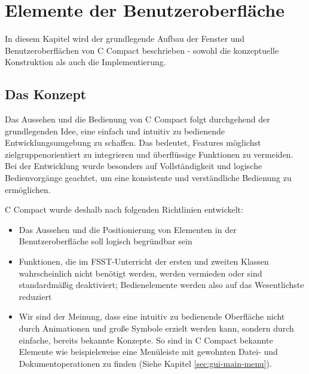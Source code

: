 

\chapter{Elemente der Benutzeroberfläche}
In diesem Kapitel wird der grundlegende Aufbau der Fenster und Benutzeroberflächen von C Compact beschrieben - sowohl die konzeptuelle Konstruktion als auch die Implementierung.
\section{Das Konzept}
Das Aussehen und die Bedienung von C Compact folgt durchgehend der grundlegenden Idee, eine einfach und intuitiv zu bedienende Entwicklungsumgebung zu schaffen. Das bedeutet, Features möglichst zielgruppenorientiert zu integrieren und überflüssige Funktionen zu vermeiden. Bei der Entwicklung wurde besonders auf Vollständigkeit und logische Bedienvorgänge geachtet, um eine konsistente und verständliche Bedienung zu ermöglichen.

C Compact wurde deshalb nach folgenden Richtlinien entwickelt:
\begin{itemize}
\item Das Aussehen und die Positionierung von Elementen in der Benutzeroberfläche soll logisch begründbar sein
\item Funktionen, die im FSST-Unterricht der ersten und zweiten Klassen wahrscheinlich nicht benötigt werden, werden vermieden oder sind standardmäßig deaktiviert; Bedienelemente werden also auf das Wesentlichste reduziert
\item Wir sind der Meinung, dass eine intuitiv zu bedienende Oberfläche nicht durch Animationen und große Symbole erzielt werden kann, sondern durch einfache, bereits bekannte Konzepte. So sind in C Compact bekannte Elemente wie beispielsweise eine Menüleiste mit gewohnten Datei- und Dokumentoperationen zu finden (Siehe Kapitel \ref{sec:gui-main-menu}).
\end{itemize}

